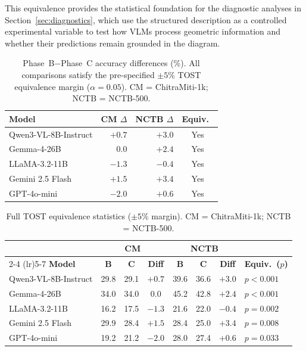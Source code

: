 \documentclass[11pt]{article}
\begin{document}
This equivalence provides the statistical foundation for the diagnostic analyses in Section~\ref{sec:diagnostics}, which use the structured description as a controlled experimental variable to test how VLMs process geometric information and whether their predictions remain grounded in the diagram.

\begin{table}[t]
\centering\small
\begin{tabular}{lrrc}
\toprule
Model & CM $\Delta$ & NCTB $\Delta$ & Equiv.\ \\
\midrule
Qwen3-VL-8B-Instruct & $+0.7$ & $+3.0$ & Yes \\
Gemma-4-26B & $0.0$ & $+2.4$ & Yes \\
LLaMA-3.2-11B & $-1.3$ & $-0.4$ & Yes \\
Gemini 2.5 Flash & $+1.5$ & $+3.4$ & Yes \\
GPT-4o-mini & $-2.0$ & $+0.6$ & Yes \\
\bottomrule
\end{tabular}
\caption{Phase~B$-$Phase~C accuracy differences (\%). All comparisons satisfy the pre-specified $\pm5$\% TOST equivalence margin ($\alpha=0.05$). CM = ChitraMiti-1k; NCTB = NCTB-500.}
\label{tab:tost}
\end{table}

\begin{table}[t]
\centering
\footnotesize
\begin{tabular}{lccccccl}
\toprule
& \multicolumn{3}{c}{\textbf{CM}} & \multicolumn{3}{c}{\textbf{NCTB}} & \\
\cmidrule(lr){2-4} \cmidrule(lr){5-7}
\textbf{Model} & \textbf{B} & \textbf{C} & \textbf{Diff} & \textbf{B} & \textbf{C} & \textbf{Diff} & \textbf{Equiv.\ ($p$)} \\
\midrule
Qwen3-VL-8B-Instruct & 29.8 & 29.1 & $+0.7$ & 39.6 & 36.6 & $+3.0$ & $p<0.001$ \\
Gemma-4-26B & 34.0 & 34.0 & $0.0$ & 45.2 & 42.8 & $+2.4$ & $p<0.001$ \\
LLaMA-3.2-11B & 16.2 & 17.5 & $-1.3$ & 21.6 & 22.0 & $-0.4$ & $p=0.002$ \\
Gemini 2.5 Flash & 29.9 & 28.4 & $+1.5$ & 28.4 & 25.0 & $+3.4$ & $p=0.008$ \\
GPT-4o-mini & 19.2 & 21.2 & $-2.0$ & 28.0 & 27.4 & $+0.6$ & $p=0.033$ \\
\bottomrule
\end{tabular}
\caption{Full TOST equivalence statistics ($\pm5$\% margin). CM = ChitraMiti-1k; NCTB = NCTB-500.}
\label{tab:tost_full}
\end{table}
\end{document}

